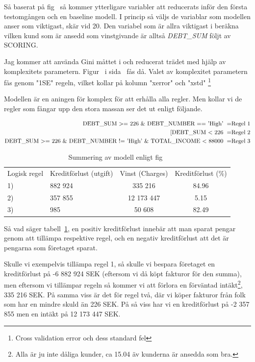 \documentclass[swedish, english, 11pt ]{article}
\makeatletter
\let\reftagform@=\tagform@
\def\tagform@#1{\maketag@@@{(\ignorespaces\textcolor{blue}{#1}\unskip\@@italiccorr)}}
\renewcommand{\eqref}[1]{\textup{\reftagform@{\ref{#1}}}}
\numberwithin{equation}{section}
\makeatother
\begin{document}
Så baserat på fig~\eqref{fig:imp} så kommer ytterligare variabler att reducerats inför den första 
testomgången och en baseline modell. I princip så väljs de variablar som modellen anser som 
viktigast, skär vid 20. Den variabel som är allra viktigast i beräkna vilken kund som är ansedd som 
vinstgivande är alltså \textit{DEBT\_SUM} följt av SCORING.

Jag kommer att använda Gini måttet i och reducerat trädet med hjälp av komplexitets parametern.
Figur~\eqref{fig:tree1} i sida~\pageref{fig:tree1} fås då. Valet av komplexitet parametern fås genom 
"1SE" regeln, vilket kollar på kolumn "xerror" och "xstd" \footnote{ Cross validation error  och dess standard fel } 

Modellen är en aningen för komplex för att erhålla alla regler. Men kollar vi de regler som fångar upp 
den stora massan ser det ut enligt följande.



\begin{align}
	\text{DEBT\_SUM >= 226 \& DEBT\_NUMBER == 'High' } 	= & \text{Regel 1}  \\  \notag
	\text{[DEBT\_SUM < 226   } 							= &\text{Regel 2} \\   \notag
	\text{DEBT\_SUM >= 226 \& DEBT\_NUMBER != 'High' \& TOTAL\_INCOME < 88000 } = & \text{Regel 3} \notag
\end{align}

\begin{table}[ht]
\centering
\caption{ Summering av modell enligt fig~\eqref{fig:tree1}}
\setlength{\extrarowheight}{2pt}
\begin{tabular}{l>{\sffamily}l c c}
\toprule 
Logisk regel  &  Kreditförlust (utgift) & Vinst (Charges)  & Kreditförlust (\%)   \\
\cmidrule(l){2-4}
	1) & -6 882 924  & 335 216 & 84.96 \\
	 2) & -2 357 855  & 12 173 447  & 5.15  \\
	3)  & -809 985  & 50 608 & 82.49   \\
\bottomrule
\end{tabular}
\label{Q:1}
\end{table}

Så vad säger tabell~\ref{Q:1}, en positiv kreditförlust innebär att man sparat pengar genom att tillämpa 
respektive regel, och en negativ kreditförlust att det är pengarna som företaget sparat.

Skulle vi exempelvis tillämpa regel 1, så skulle vi bespara företaget en kreditförlust på -6 882 924 SEK
(eftersom vi då köpt fakturor för den summa), men eftersom vi tillämpar regeln så kommer vi att förlora en förväntad intäkt\footnote{
	Alla är ju inte dåliga kunder, ca  15.04 äv kunderna är ansedda som bra.
},  335 216   SEK. På samma viss är det för regel två, där vi köper fakturor från folk som har 
en mindre skuld än 226 SEK. På så viss har vi en kreditförlust på -2 357 855 men en 
intäkt på 12 173 447 SEK.
\end{document}
